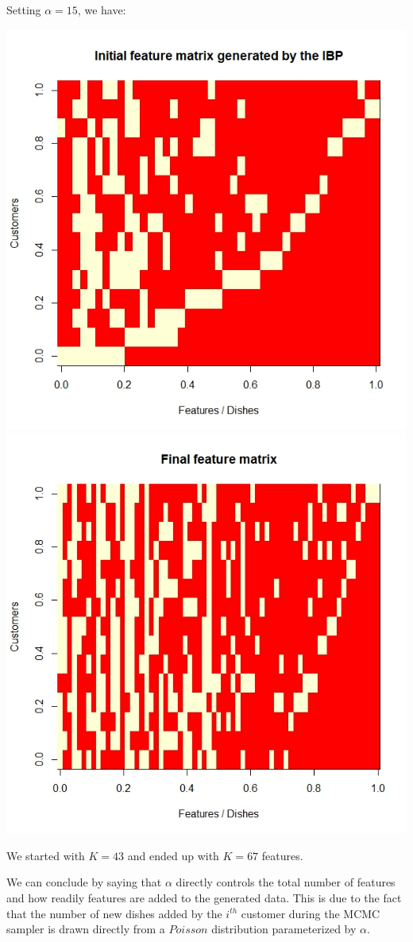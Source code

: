 \documentclass[]{article}
\begin{document}
Setting $\alpha=15$, we have:
\begin{center}
	\includegraphics[width=.4\textwidth]{task7/output_initial_alpha15_sigma05_N15.jpeg}
	\includegraphics[width=.4\textwidth]{task7/output_final_alpha15_sigma05_N15.jpeg}
\end{center}
We started with $K=43$ and ended up with $K=67$ features.

We can conclude by saying that  $\alpha$ directly controls the total number of features and how readily features are added to the generated data. This is due to the fact that the number of new dishes added by the $i^{th}$ customer during the MCMC sampler is drawn directly from a $Poisson$ distribution parameterized by $\alpha$.
\end{document}
